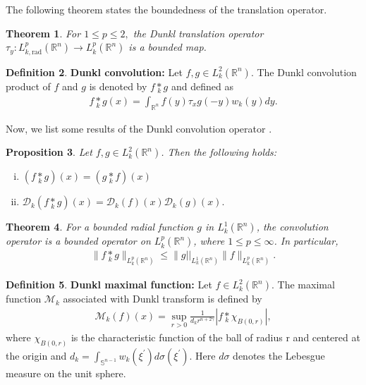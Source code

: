 \documentclass[11pt,a4paper,reqno]{amsproc}
\newtheorem{theorem}{Theorem}[section]
\newtheorem{proposition}[theorem]{Proposition}
\theoremstyle{definition}
\newtheorem{definition}[theorem]{Definition}
\theoremstyle{remark}
\numberwithin{equation}{section}
\begin{document}
The following theorem states the boundedness of the translation operator.
 \begin{theorem}\cite{Thangavelu}\label{C.Trns}
    For $1\leq p\leq 2,$ the Dunkl translation operator $\tau_y:L_{k,\text{rad}}^p(\mathbb{R}^n) \longrightarrow L_{k}^p(\mathbb{R}^n) $ is a bounded map.  
  \end{theorem}
\begin{definition}
    \textbf{Dunkl convolution:}  Let $f,g \in L_k^2(\mathbb{R}^n)$. The Dunkl convolution product  of $f$ and $g$ is denoted by $f\underset{k}{\ast} g$ and defined  as \cite{Thangavelu}
       \begin{align*}
          f \underset{k}{\ast} g(x) = \int_{\mathbb{R}^n} f(y)\tau_xg(-y)w_k(y)dy.
       \end{align*}
\end{definition}
Now, we list some results of the Dunkl convolution operator \cite{Thangavelu}. 
\begin{proposition} \label{D.C-Property}
   Let $f,g\in L_k^2(\mathbb{R}^n)$. Then the following holds:
   \begin{enumerate}[(i)]
       \item $(f\underset{k}{\ast}g)(x)=(g\underset{k}{\ast}f)(x)$ 
       \item $\mathcal{D}_k(f\underset{k}{\ast}g)(x)=\mathcal{D}_k(f)(x)\mathcal{D}_k(g)(x).$
   \end{enumerate}
\end{proposition}
\begin{theorem} \label{D.C.continuity}
    For a bounded radial function $g$ in $L_k^1(\mathbb{R}^n)$, the convolution operator is a bounded operator on $L_k^p(\mathbb{R}^n)$, where $1\leq p\leq\infty$. In particular,
    \begin{align*}
        \| f\underset{k}{\ast}g  \|_{L_k^p(\mathbb{R}^n)} \leq \|g||_{L_k^1(\mathbb{R}^n)} \|f\|_{L_k^p(\mathbb{R}^n)}.
    \end{align*}
\end{theorem} 

\begin{definition}\textbf{Dunkl maximal function:} Let $f\in L_k^2(\mathbb{R}^n)$. The maximal function $\mathcal{M}_k$ associated with Dunkl transform is defined by \cite{Thangavelu} 
\begin{align*}
    \mathcal{M}_k(f)(x) = \underset{r>0}{\sup} \frac{1}{d_k r^{n+2\gamma}}\left|f\underset{k}{\ast}\chi_{B(0,r)} \right|, 
\end{align*} where $\chi_{B(0,r)}$ is the characteristic function of the ball of radius r and centered at the origin and $d_k=\int_{\mathbb{S}^{n-1}} w_k(\xi^\prime)d\sigma(\xi^\prime)$. Here $d\sigma$ denotes the Lebesgue measure on the unit sphere.
    
\end{definition}
\end{document}
